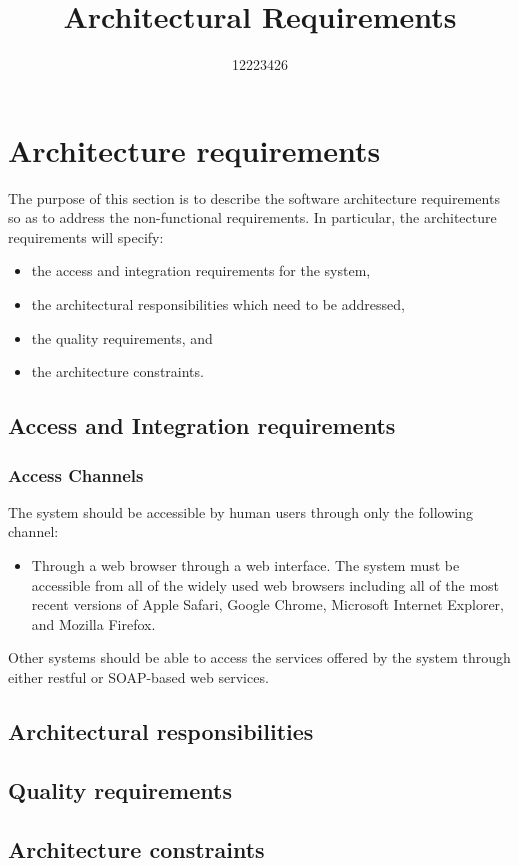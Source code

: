 \documentclass[11pt,a4paper]{article}
\begin{document}
\begin{titlepage}
\title{Architectural Requirements}
\author{12223426}
\maketitle
\end{titlepage}

\section{Architecture requirements}
The purpose of this section is to describe the software architecture requirements so as to address the non-functional requirements. In particular, the architecture requirements will specify:
\begin{itemize}
	\item the access and integration requirements for the system,
	\item the architectural responsibilities which need to be addressed,
	\item the quality requirements, and
	\item the architecture constraints.
\end{itemize}

	\subsection{Access and Integration requirements}
		\subsubsection{Access Channels}
		The system should be accessible by human users through only the following channel:
		\begin{itemize}
			\item Through a web browser through a web interface. The system must be accessible from all of the widely used web browsers including all of the most recent versions of Apple Safari, Google Chrome, Microsoft Internet Explorer, and Mozilla Firefox.
		\end{itemize}

Other systems should be able to access the services offered by the system through either restful or SOAP-based web services.
		
	\subsection{Architectural responsibilities}
		 
	\subsection{Quality requirements}
		 
	\subsection{ Architecture constraints}
 
\end{document}
